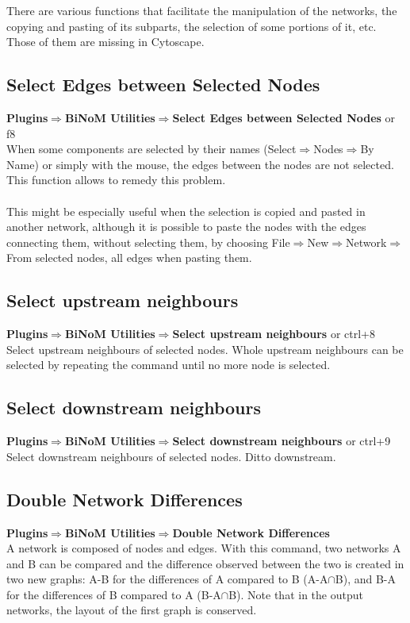 There are various functions that facilitate the manipulation of the networks, the copying and pasting of its subparts, the selection of some portions of it, etc. Those of them are missing in Cytoscape.
\subsection{Select Edges between Selected Nodes}
\textbf{Plugins$\Rightarrow$BiNoM Utilities$\Rightarrow$Select Edges between Selected Nodes} or f8\\
When some components are selected by their names (Select$\Rightarrow$Nodes$\Rightarrow$By Name) or simply with the mouse, the edges between the nodes are not selected. This function allows to remedy this problem.\\\\
This might be especially useful when the selection is copied and pasted in another network, although it is possible to paste the nodes with the edges connecting them, without selecting them, by choosing File$\Rightarrow$New$\Rightarrow$Network$\Rightarrow$From selected nodes, all edges when pasting them.

\subsection{Select upstream neighbours}
\textbf{Plugins$\Rightarrow$BiNoM Utilities$\Rightarrow$Select upstream neighbours} or ctrl+8\\
Select upstream neighbours of selected nodes. Whole upstream neighbours can be selected by repeating the command until no more node is selected.

\subsection{Select downstream neighbours}
\textbf{Plugins$\Rightarrow$BiNoM Utilities$\Rightarrow$Select downstream neighbours} or ctrl+9\\
Select downstream neighbours of selected nodes. Ditto downstream.

\subsection{Double Network Differences}
\textbf{Plugins$\Rightarrow$BiNoM Utilities$\Rightarrow$Double Network Differences}\\
A network is composed of nodes and edges. With this command, two networks A and B can be compared and the difference observed between the two is created in two new graphs: A-B for the differences of A compared to B (A-A$\cap$B), and B-A for the differences of B compared to A (B-A$\cap$B). Note that in the output networks, the layout of the first graph is conserved.

